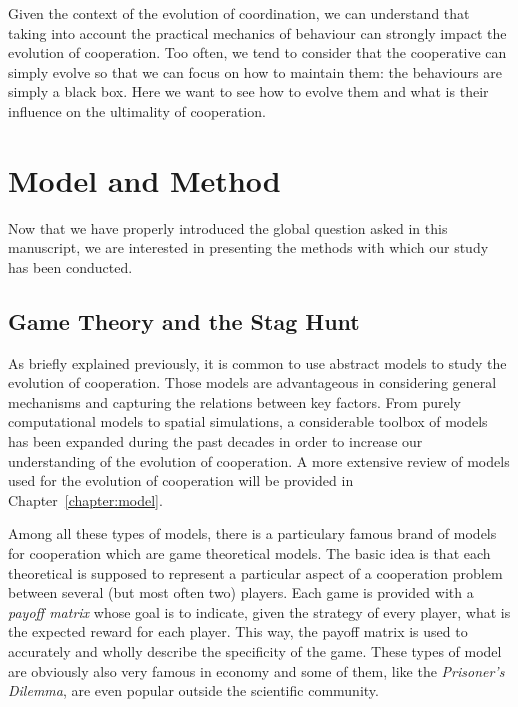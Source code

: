     Given the context of the evolution of coordination, we can understand that taking into account the practical mechanics of behaviour can strongly impact the evolution of cooperation. Too often, we tend to consider that the cooperative can simply evolve so that we can focus on how to maintain them: the behaviours are simply a black box. Here we want to see how to evolve them and what is their influence on the ultimality of cooperation.





\section{Model and Method}

  Now that we have properly introduced the global question asked in this manuscript, we are interested in presenting the methods with which our study has been conducted.
  
  \subsection{Game Theory and the Stag Hunt}

    As briefly explained previously, it is common to use abstract models to study the evolution of cooperation. Those models are advantageous in considering general mechanisms and capturing the relations between key factors. From purely computational models to spatial simulations, a considerable toolbox of models has been expanded during the past decades in order to increase our understanding of the evolution of cooperation. A more extensive review of models used for the evolution of cooperation will be provided in Chapter~\ref{chapter:model}.

    Among all these types of models, there is a particulary famous brand of models for cooperation which are game theoretical models. The basic idea is that each theoretical is supposed to represent a particular aspect of a cooperation problem between several (but most often two) players. Each game is provided with a \emph{payoff matrix} whose goal is to indicate, given the strategy of every player, what is the expected reward for each player. This way, the payoff matrix is used to accurately and wholly describe the specificity of the game. These types of model are obviously also very famous in economy and some of them, like the \emph{Prisoner's Dilemma}, are even popular outside the scientific community.

